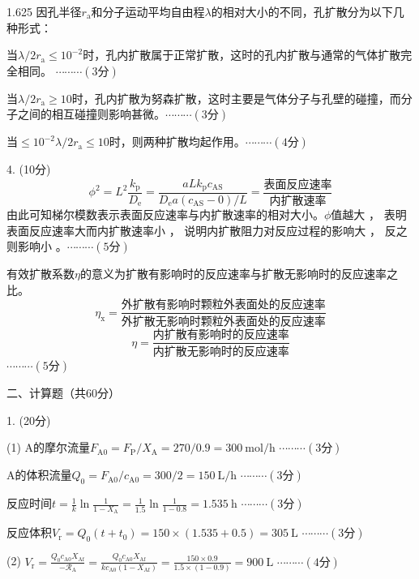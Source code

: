 \documentclass[12pt, b5paper]{article}
\begin{document}
\begin{spacing}{1.625}
因孔半径$r_\mathrm{a}$和分子运动平均自由程$\lambda$的相对大小的不同，孔扩散分为以下几种形式：

当$\lambda/2r_\mathrm{a}\leqslant 10^{-2}$时，孔内扩散属于正常扩散，这时的孔内扩散与通常的气体扩散完全相同。 \hfill $\cdots \cdots \cdots (3\text{分})$

当$\lambda/2r_\mathrm{a}\geqslant 10$时，孔内扩散为努森扩散，这时主要是气体分子与孔壁的碰撞，而分子之间的相互碰撞则影响甚微。\hfill $\cdots \cdots \cdots (3\text{分})$

当$\leqslant 10^{-2} \lambda/2r_\mathrm{a}\leqslant 10$时，则两种扩散均起作用。\hfill $\cdots \cdots \cdots (4\text{分})$

\bigskip
\bigskip

4. (10分) 
\[
	\phi^{2}=L^{2}\frac{k_{\mathrm{p}}}{D_{\mathrm{e}}}=\frac{aLk_{\mathrm{p}}c_{\mathrm{AS}}}{D_{\mathrm{e}}a(c_{\mathrm{AS}}-0)/L}=\frac{\text{表面反应速率}}{\text{内扩散速率}}
\]
由此可知梯尔模数表示表面反应速率与内扩散速率的相对大小。$\phi$值越大 ， 表明表面反应速率大而内扩散速率小 ， 说明内扩散阻力对反应过程的影响大 ， 反之则影响小 。\hfill $\cdots \cdots \cdots (5\text{分})$

有效扩散系数$\eta$的意义为扩散有影响时的反应速率与扩散无影响时的反应速率之比。
\[
\eta_\mathrm{x}=\frac{\text{外扩散有影响时颗粒外表面处的反应速率}}{\text{外扩散无影响时颗粒外表面处的反应速率}}
\]
\[
	\eta=\frac{\text{内扩散有影响时的反应速率}}{\text{内扩散无影响时的反应速率}} 
\]
\hfill $\cdots \cdots \cdots (5\text{分})$

\newpage 
二、计算题（共60分）

1. (20分) 

(1) A的摩尔流量$F_\mathrm{A0} = F_\mathrm{P}/X_\mathrm{A} = 270/0.9 = 300 \ \mathrm{mol/h}$ \hfill $\cdots \cdots \cdots (3\text{分})$

A的体积流量$Q_0 = F_\mathrm{A0}/c_\mathrm{A0} = 300/2 = 150 \ \mathrm{L/h}$ \hfill $\cdots \cdots \cdots (3\text{分})$

反应时间$t = \frac{1}{k}\ln{\frac{1}{1-X_\mathrm{A}}} = \frac{1}{1.5}\ln{\frac{1}{1-0.8}} = 1.535\ \mathrm{h}$ \hfill $\cdots \cdots \cdots (3\text{分})$

反应体积$V_\mathrm{r} = Q_0(t+t_0) = 150\times (1.535+0.5) = 305\ \mathrm{L}$ \hfill $\cdots \cdots \cdots (3\text{分})$

(2) $V_\mathrm{r} = \frac{Q_0c_\mathrm{A0}X_\mathrm{Af}}{-\mathscr{R}_\mathrm{A}} = \frac{Q_0c_\mathrm{A0}X_\mathrm{Af}}{kc_\mathrm{A0}(1-X_\mathrm{Af})} = \frac{150\times 0.9}{1.5\times (1-0.9)} = 900 \ \mathrm{L}$ \hfill $\cdots \cdots \cdots (4\text{分})$


\end{spacing}
\end{document}
